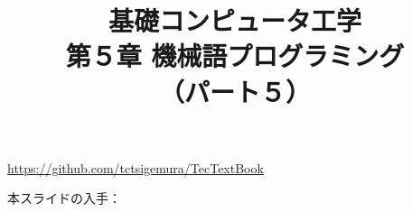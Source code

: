 \documentclass[handout]{beamer}        %
\begin{document}
\title{基礎コンピュータ工学\\第５章 機械語プログラミング\\（パート５）}
\date{}

\begin{frame}
  \titlepage
  \centerline{\url{https://github.com/tctsigemura/TecTextBook}}
  \vfill
  \centerline{本スライドの入手：
    }
\end{frame}

\end{document}
